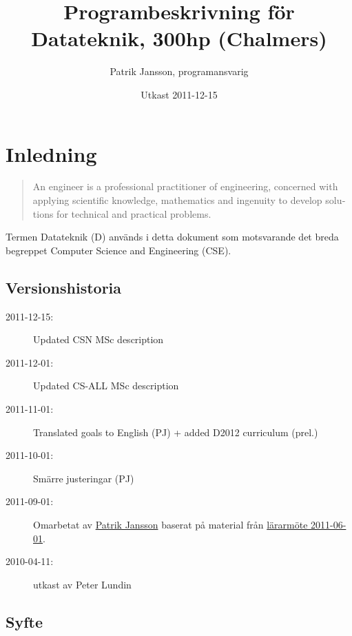\documentclass[twocolumn]{article}
\title{Programbeskrivning för Datateknik, 300hp (Chalmers)}
\author{Patrik Jansson, programansvarig}
\date{Utkast 2011-12-15}
\begin{document}
\maketitle
\section{Inledning}

\begin{quote}
  \foreignlanguage{british}{An engineer is a professional practitioner
    of engineering, concerned with applying scientific knowledge,
    mathematics and ingenuity to develop solutions for technical and
    practical problems. }
\end{quote}

Termen Datateknik (D) används i detta dokument som motsvarande det
breda begreppet \foreignlanguage{british}{Computer Science and
  Engineering (CSE)}.

\subsection*{Versionshistoria}
{\small
\begin{description}
\item[2011-12-15:] Updated CSN MSc description
\item[2011-12-01:] Updated CS-ALL MSc description
\item[2011-11-01:] Translated goals to English (PJ) + added D2012 curriculum (prel.)
\item[2011-10-01:] Smärre justeringar (PJ)
\item[2011-09-01:] Omarbetat av \href{http://www.chalmers.se/cse/EN/people/jansson-patrik}{Patrik Jansson} baserat på material från
\href{http://wiki.portal.chalmers.se/cse/pmwiki.php/PAD/L%C3%A4rarm%C3%B6teVT2011}{lärarmöte 2011-06-01}.
\item[2010-04-11:] utkast av Peter Lundin
\end{description}
}

\subsection{Syfte}
\end{document}
